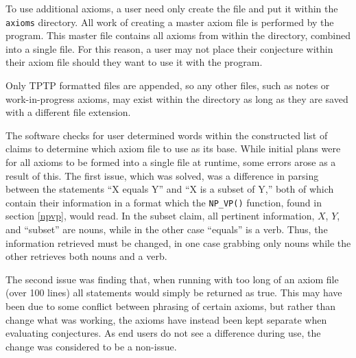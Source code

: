 To use additional axioms, a user need only create the file and put it within the \texttt{axioms} directory. All work of creating a master axiom file is performed by the program. This master file contains all axioms from within the directory, combined into a single file. For this reason, a user may not place their conjecture within their axiom file should they want to use it with the program.

Only TPTP formatted files are appended, so any other files, such as notes or work-in-progress axioms, may exist within the directory as long as they are saved with a different file extension.

The software checks for user determined words within the constructed list of claims to determine which axiom file to use as its base. While initial plans were for all axioms to be formed into a single file at runtime, some errors arose as a result of this. The first issue, which was solved, was a difference in parsing between the statements ``X equals Y'' and ``X is a subset of Y,'' both of which contain their information in a format which the \texttt{NP\_VP()} function, found in section \ref{npvp}, would read. In the subset claim, all pertinent information, $X$, $Y$, and ``subset'' are nouns, while in the other case ``equals'' is a verb. Thus, the information retrieved must be changed, in one case grabbing only nouns while the other retrieves both nouns and a verb.

The second issue was finding that, when running with too long of an axiom file (over 100 lines) all statements would simply be returned as true. This may have been due to some conflict between phrasing of certain axioms, but rather than change what was working, the axioms have instead been kept separate when evaluating conjectures. As end users do not see a difference during use, the change was considered to be a non-issue.

